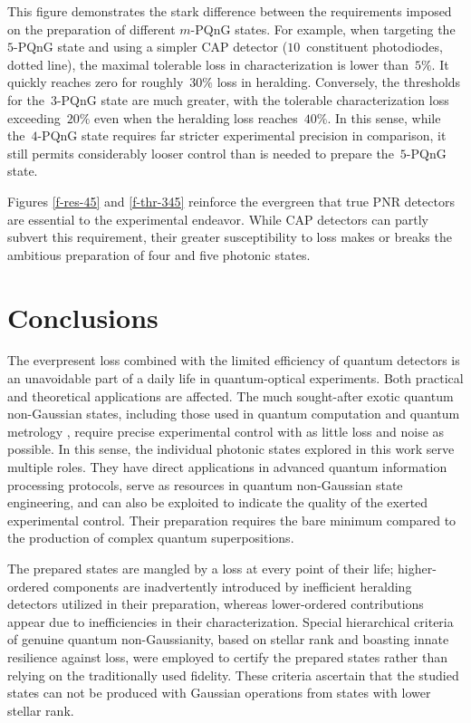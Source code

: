 \documentclass{article}
\begin{document}
This figure demonstrates the stark difference between the requirements imposed on the preparation of different $m$-PQnG states. For example, when targeting the~$5$-PQnG state and using a simpler CAP detector ($10$~constituent photodiodes, dotted line), the maximal tolerable loss in characterization is lower than~$5\%$. It quickly reaches zero for roughly~$30\%$ loss in heralding. Conversely, the thresholds for the~$3$-PQnG state are much greater, with the tolerable characterization loss exceeding~$20\%$ even when the heralding loss reaches~$40\%$. In this sense, while the~$4$-PQnG state requires far stricter experimental precision in comparison, it still permits considerably looser control than is needed to prepare the~$5$-PQnG state.

Figures \ref{f-res-45} and \ref{f-thr-345} reinforce the evergreen that true PNR detectors are essential to the experimental endeavor. While CAP detectors can partly subvert this requirement, their greater susceptibility to loss makes or breaks the ambitious preparation of four and five photonic states.

%

\FloatBarrier
\section{Conclusions}

The everpresent loss combined with the limited efficiency of quantum detectors is an unavoidable part of a daily life in quantum-optical experiments. Both practical and theoretical applications are affected. The much sought-after exotic quantum non-Gaussian states, including those used in quantum computation and quantum metrology \cite{marek2009,kunitski2019,oh2020}, require precise experimental control with as little loss and noise as possible. In this sense, the individual photonic states explored in this work serve multiple roles. They have direct applications in advanced quantum information processing protocols, serve as resources in quantum non-Gaussian state engineering, and can also be exploited to indicate the quality of the exerted experimental control. Their preparation requires the bare minimum compared to the production of complex quantum superpositions.

The prepared states are mangled by a loss at every point of their life; higher-ordered components are inadvertently introduced by inefficient heralding detectors utilized in their preparation, whereas lower-ordered contributions appear due to inefficiencies in their characterization. Special hierarchical criteria of genuine quantum non-Gaussianity, based on stellar rank and boasting innate resilience against loss, were employed to certify the prepared states rather than relying on the traditionally used fidelity. These criteria ascertain that the studied states can not be produced with Gaussian operations from states with lower stellar rank.
\end{document}

